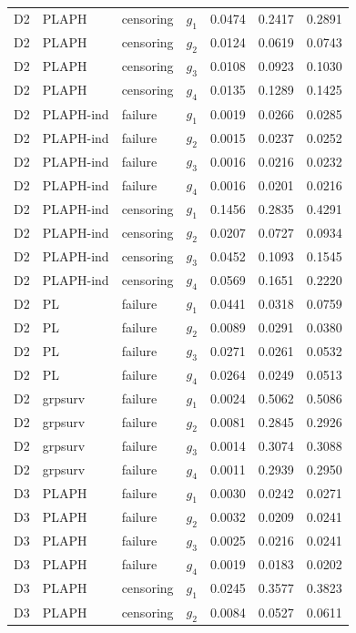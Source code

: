 \begin{longtable}{clllrrr}
D2 & PLAPH & censoring & $g_{1}$ & 0.0474 & 0.2417 & 0.2891 \\
D2 & PLAPH & censoring & $g_{2}$ & 0.0124 & 0.0619 & 0.0743 \\
D2 & PLAPH & censoring & $g_{3}$ & 0.0108 & 0.0923 & 0.1030 \\
D2 & PLAPH & censoring & $g_{4}$ & 0.0135 & 0.1289 & 0.1425 \\
D2 & PLAPH-ind & failure & $g_{1}$ & 0.0019 & 0.0266 & 0.0285 \\
D2 & PLAPH-ind & failure & $g_{2}$ & 0.0015 & 0.0237 & 0.0252 \\
D2 & PLAPH-ind & failure & $g_{3}$ & 0.0016 & 0.0216 & 0.0232 \\
D2 & PLAPH-ind & failure & $g_{4}$ & 0.0016 & 0.0201 & 0.0216 \\
D2 & PLAPH-ind & censoring & $g_{1}$ & 0.1456 & 0.2835 & 0.4291 \\
D2 & PLAPH-ind & censoring & $g_{2}$ & 0.0207 & 0.0727 & 0.0934 \\
D2 & PLAPH-ind & censoring & $g_{3}$ & 0.0452 & 0.1093 & 0.1545 \\
D2 & PLAPH-ind & censoring & $g_{4}$ & 0.0569 & 0.1651 & 0.2220 \\
D2 & PL & failure & $g_{1}$ & 0.0441 & 0.0318 & 0.0759 \\
D2 & PL & failure & $g_{2}$ & 0.0089 & 0.0291 & 0.0380 \\
D2 & PL & failure & $g_{3}$ & 0.0271 & 0.0261 & 0.0532 \\
D2 & PL & failure & $g_{4}$ & 0.0264 & 0.0249 & 0.0513 \\
D2 & grpsurv & failure & $g_{1}$ & 0.0024 & 0.5062 & 0.5086 \\
D2 & grpsurv & failure & $g_{2}$ & 0.0081 & 0.2845 & 0.2926 \\
D2 & grpsurv & failure & $g_{3}$ & 0.0014 & 0.3074 & 0.3088 \\
D2 & grpsurv & failure & $g_{4}$ & 0.0011 & 0.2939 & 0.2950 \\
D3 & PLAPH & failure & $g_{1}$ & 0.0030 & 0.0242 & 0.0271 \\
D3 & PLAPH & failure & $g_{2}$ & 0.0032 & 0.0209 & 0.0241 \\
D3 & PLAPH & failure & $g_{3}$ & 0.0025 & 0.0216 & 0.0241 \\
D3 & PLAPH & failure & $g_{4}$ & 0.0019 & 0.0183 & 0.0202 \\
D3 & PLAPH & censoring & $g_{1}$ & 0.0245 & 0.3577 & 0.3823 \\
D3 & PLAPH & censoring & $g_{2}$ & 0.0084 & 0.0527 & 0.0611 \\

\end{longtable}
